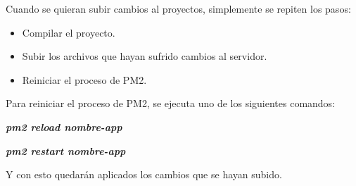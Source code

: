 Cuando se quieran subir cambios al proyectos, simplemente se repiten los pasos:
    \begin{itemize}
        \item Compilar el proyecto.
        \item Subir los archivos que hayan sufrido cambios al servidor.
        \item Reiniciar el proceso de PM2.
    \end{itemize}
Para reiniciar el proceso de PM2, se ejecuta uno de los siguientes comandos:
    \begin{center}
        \textbf{
            \emph{
                pm2 reload nombre-app
                }
            }

        \textbf{
            \emph{
                pm2 restart nombre-app
            }
        }
    \end{center}
Y con esto quedarán aplicados los cambios que se hayan subido.